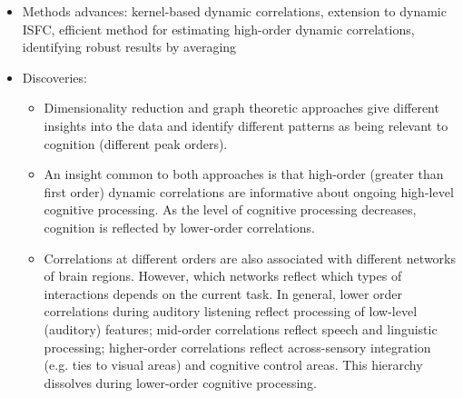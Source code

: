 \documentclass[english]{article}
\begin{document}
\begin{itemize}
  \item Methods advances: kernel-based dynamic correlations, extension to
    dynamic ISFC, efficient method for estimating high-order dynamic
    correlations, identifying robust results by averaging
  \item Discoveries:
    \begin{itemize}
      \item Dimensionality reduction and graph theoretic approaches
        give different insights into the data and identify different
        patterns as being relevant to cognition (different peak
        orders).
        \item An insight common to both approaches is that high-order
          (greater than first order) dynamic correlations are
          informative about ongoing high-level cognitive processing.
          As the level of cognitive processing decreases, cognition is
          reflected by lower-order correlations.
        \item Correlations at different orders are also associated
          with different networks of brain regions.  However, which
          networks reflect which types of interactions depends on the
          current task.  In general, lower order correlations during
          auditory listening reflect processing of low-level
          (auditory) features; mid-order correlations reflect speech
          and linguistic processing; higher-order correlations reflect
          across-sensory integration (e.g. ties to visual areas) and
          cognitive control areas.  This hierarchy dissolves during
          lower-order cognitive processing.
      \end{itemize}
  \end{itemize}
\end{document}
